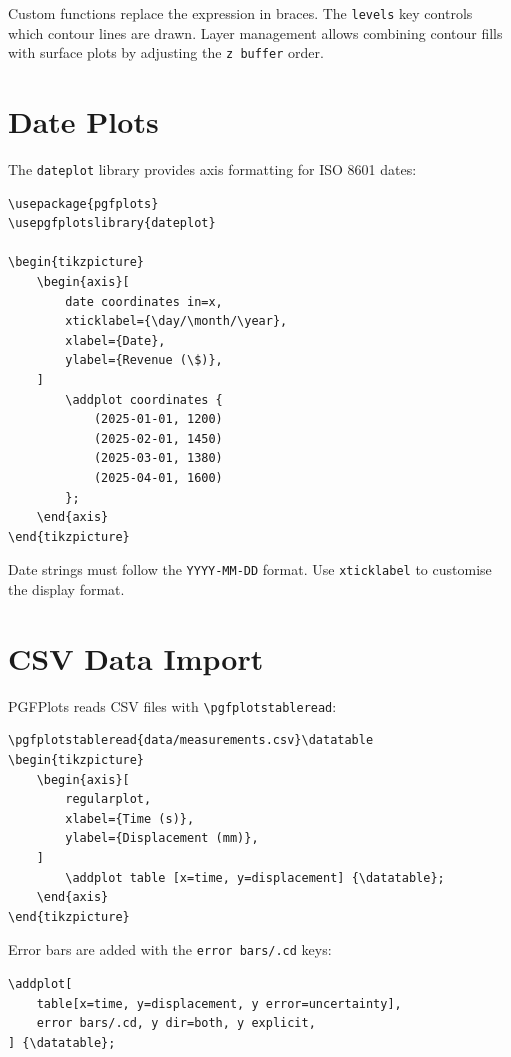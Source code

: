 Custom functions replace the expression in braces. The \texttt{levels} key
controls which contour lines are drawn. Layer management allows combining
contour fills with surface plots by adjusting the \texttt{z buffer} order.

\section{Date Plots}

The \texttt{dateplot} library provides axis formatting for ISO 8601 dates:

\begin{verbatim}
\usepackage{pgfplots}
\usepgfplotslibrary{dateplot}

\begin{tikzpicture}
    \begin{axis}[
        date coordinates in=x,
        xticklabel={\day/\month/\year},
        xlabel={Date},
        ylabel={Revenue (\$)},
    ]
        \addplot coordinates {
            (2025-01-01, 1200)
            (2025-02-01, 1450)
            (2025-03-01, 1380)
            (2025-04-01, 1600)
        };
    \end{axis}
\end{tikzpicture}
\end{verbatim}

Date strings must follow the \texttt{YYYY-MM-DD} format. Use
\texttt{xticklabel} to customise the display format.

\section{CSV Data Import}

PGFPlots reads CSV files with \verb|\pgfplotstableread|:

\begin{verbatim}
\pgfplotstableread{data/measurements.csv}\datatable
\begin{tikzpicture}
    \begin{axis}[
        regularplot,
        xlabel={Time (s)},
        ylabel={Displacement (mm)},
    ]
        \addplot table [x=time, y=displacement] {\datatable};
    \end{axis}
\end{tikzpicture}
\end{verbatim}

Error bars are added with the \texttt{error bars/.cd} keys:

\begin{verbatim}
\addplot[
    table[x=time, y=displacement, y error=uncertainty],
    error bars/.cd, y dir=both, y explicit,
] {\datatable};
\end{verbatim}

